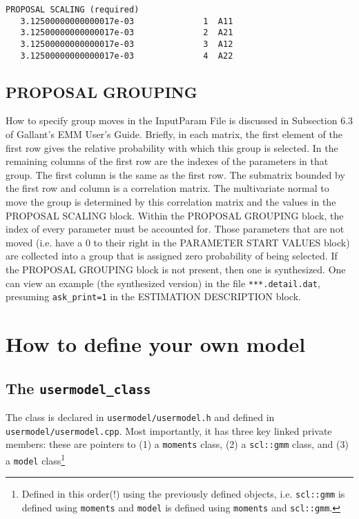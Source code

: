 \documentclass[11pt, letterpaper, notitlepage]{article}
\begin{document}
\begin{verbatim}
PROPOSAL SCALING (required)
   3.12500000000000017e-03              1  A11
   3.12500000000000017e-03              2  A21
   3.12500000000000017e-03              3  A12
   3.12500000000000017e-03              4  A22
\end{verbatim}

\subsection{PROPOSAL GROUPING}


How to specify group moves in the InputParam File is discussed in Subsection $6.3$ of Gallant's EMM User's Guide. Briefly, in each matrix, the first element of the first row gives the relative probability with which this group is selected. In the remaining columns of the first row are the indexes of the parameters in that group. The first column is the same as the first row. The submatrix bounded by the first row and column is a correlation matrix. The multivariate normal to move the group is determined by this correlation matrix and the values in the PROPOSAL SCALING block. Within the PROPOSAL GROUPING block, the index of every parameter must be accounted for. Those parameters that are not moved (i.e. have a $0$ to their right in the PARAMETER START VALUES
block) are collected into a group that is assigned zero probability of being selected. If the PROPOSAL GROUPING block is not present, then one is synthesized. One can view an example (the synthesized version) in the
file \texttt{***.detail.dat}, presuming \texttt{ask\_print=1} in the ESTIMATION DESCRIPTION block.

\pagebreak

\section{How to define your own model}


\subsection{The \texttt{usermodel\_class}}

The class is declared in \texttt{usermodel/usermodel.h} and defined in \texttt{usermodel/usermodel.cpp}. Most importantly, it has three key linked private members: these are pointers to (1) a \texttt{moments} class, (2) a \texttt{scl::gmm} class, and (3) a \texttt{model} class\footnote{Defined in this order(!) using the previously defined objects, i.e. \texttt{scl::gmm} is defined using \texttt{moments} and \texttt{model} is defined using \texttt{moments} and \texttt{scl::gmm}.}
\end{document}
